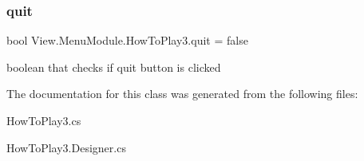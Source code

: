 \subsubsection{\texorpdfstring{quit}{quit}}
{\footnotesize\ttfamily bool View.\+Menu\+Module.\+How\+To\+Play3.\+quit = false}

boolean that checks if quit button is clicked 

The documentation for this class was generated from the following files\+:\begin{DoxyCompactItemize}
\item 
How\+To\+Play3.\+cs\item 
How\+To\+Play3.\+Designer.\+cs\end{DoxyCompactItemize}
